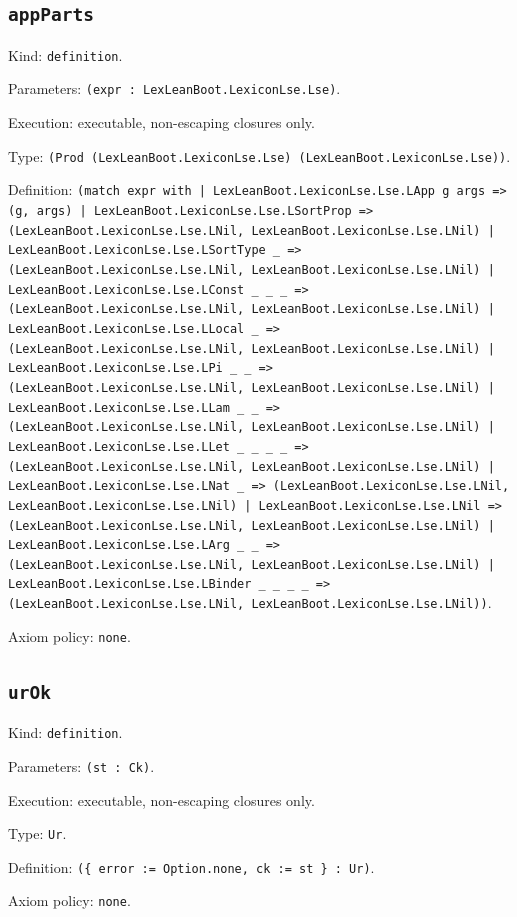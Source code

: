 \documentclass[11pt]{article}
\begin{document}
\subsection*{\texttt{appParts}}
\noindent Kind: \texttt{definition}.\par
\noindent Parameters: \texttt{(expr : LexLeanBoot.LexiconLse.Lse)}.\par
\noindent Execution: executable, non-escaping closures only.\par
\noindent Type: \texttt{(Prod (LexLeanBoot.LexiconLse.Lse) (LexLeanBoot.LexiconLse.Lse))}.\par
\noindent Definition: \texttt{(match expr with | LexLeanBoot.LexiconLse.Lse.LApp g args => (g, args) | LexLeanBoot.LexiconLse.Lse.LSortProp => (LexLeanBoot.LexiconLse.Lse.LNil, LexLeanBoot.LexiconLse.Lse.LNil) | LexLeanBoot.LexiconLse.Lse.LSortType \_ => (LexLeanBoot.LexiconLse.Lse.LNil, LexLeanBoot.LexiconLse.Lse.LNil) | LexLeanBoot.LexiconLse.Lse.LConst \_ \_ \_ => (LexLeanBoot.LexiconLse.Lse.LNil, LexLeanBoot.LexiconLse.Lse.LNil) | LexLeanBoot.LexiconLse.Lse.LLocal \_ => (LexLeanBoot.LexiconLse.Lse.LNil, LexLeanBoot.LexiconLse.Lse.LNil) | LexLeanBoot.LexiconLse.Lse.LPi \_ \_ => (LexLeanBoot.LexiconLse.Lse.LNil, LexLeanBoot.LexiconLse.Lse.LNil) | LexLeanBoot.LexiconLse.Lse.LLam \_ \_ => (LexLeanBoot.LexiconLse.Lse.LNil, LexLeanBoot.LexiconLse.Lse.LNil) | LexLeanBoot.LexiconLse.Lse.LLet \_ \_ \_ \_ => (LexLeanBoot.LexiconLse.Lse.LNil, LexLeanBoot.LexiconLse.Lse.LNil) | LexLeanBoot.LexiconLse.Lse.LNat \_ => (LexLeanBoot.LexiconLse.Lse.LNil, LexLeanBoot.LexiconLse.Lse.LNil) | LexLeanBoot.LexiconLse.Lse.LNil => (LexLeanBoot.LexiconLse.Lse.LNil, LexLeanBoot.LexiconLse.Lse.LNil) | LexLeanBoot.LexiconLse.Lse.LArg \_ \_ => (LexLeanBoot.LexiconLse.Lse.LNil, LexLeanBoot.LexiconLse.Lse.LNil) | LexLeanBoot.LexiconLse.Lse.LBinder \_ \_ \_ \_ => (LexLeanBoot.LexiconLse.Lse.LNil, LexLeanBoot.LexiconLse.Lse.LNil))}.\par
\noindent Axiom policy: \texttt{none}.\par
\subsection*{\texttt{urOk}}
\noindent Kind: \texttt{definition}.\par
\noindent Parameters: \texttt{(st : Ck)}.\par
\noindent Execution: executable, non-escaping closures only.\par
\noindent Type: \texttt{Ur}.\par
\noindent Definition: \texttt{(\{ error := Option.none, ck := st \} : Ur)}.\par
\noindent Axiom policy: \texttt{none}.\par
\end{document}
